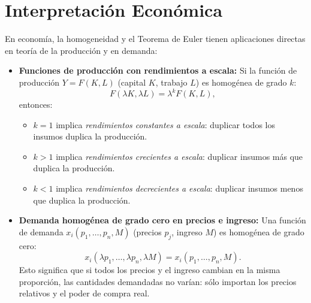 \documentclass{article}
\begin{document}
\section*{Interpretación Económica}

En economía, la homogeneidad y el Teorema de Euler tienen aplicaciones directas en teoría de la producción y en demanda:

\begin{itemize}
  \item \textbf{Funciones de producción con rendimientos a escala:}  
    Si la función de producción \(Y = F(K,L)\) (capital \(K\), trabajo \(L\)) es homogénea de grado \(k\):
    \[
      F(\lambda K,\lambda L) = \lambda^k F(K,L),
    \]
    entonces:
    \begin{itemize}
      \item \(k=1\) implica \emph{\color{teal}rendimientos constantes a escala}: duplicar todos los insumos duplica la producción.
      \item \(k>1\) implica \emph{\color{teal}rendimientos crecientes a escala}: duplicar insumos más que duplica la producción.
      \item \(k<1\) implica \emph{\color{teal}rendimientos decrecientes a escala}: duplicar insumos menos que duplica la producción.
    \end{itemize}

  \item \textbf{Demanda homogénea de grado cero en precios e ingreso:}  
    Una función de demanda \(x_i(p_1,\dots,p_n,M)\) (precios \(p_j\), ingreso \(M\)) es homogénea de grado cero:
    \[
      x_i(\lambda p_1,\dots,\lambda p_n,\lambda M)
      = x_i(p_1,\dots,p_n,M).
    \]
    Esto significa que si todos los precios y el ingreso cambian en la misma proporción, las cantidades demandadas no varían: sólo importan los precios relativos y el poder de compra real.


\end{itemize}
\end{document}
